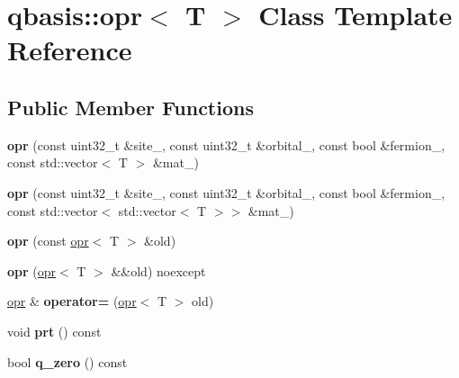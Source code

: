 \hypertarget{classqbasis_1_1opr}{}\section{qbasis\+:\+:opr$<$ T $>$ Class Template Reference}
\label{classqbasis_1_1opr}
\subsection*{Public Member Functions}
\begin{DoxyCompactItemize}
\item 
\mbox{\label{classqbasis_1_1opr_ab209565d2cbc1a241437dee946813fda}} 
{\bfseries opr} (const uint32\+\_\+t \&site\+\_\+, const uint32\+\_\+t \&orbital\+\_\+, const bool \&fermion\+\_\+, const std\+::vector$<$ T $>$ \&mat\+\_\+)
\item 
\mbox{\label{classqbasis_1_1opr_a162e69e386933f1c05e528b68505b103}} 
{\bfseries opr} (const uint32\+\_\+t \&site\+\_\+, const uint32\+\_\+t \&orbital\+\_\+, const bool \&fermion\+\_\+, const std\+::vector$<$ std\+::vector$<$ T $>$$>$ \&mat\+\_\+)
\item 
\mbox{\label{classqbasis_1_1opr_adad9b936ab5d56fe95c3fddce184a5e2}} 
{\bfseries opr} (const \hyperlink{classqbasis_1_1opr}{opr}$<$ T $>$ \&old)
\item 
\mbox{\label{classqbasis_1_1opr_a38a0c9e69989bf991066db88881cadd0}} 
{\bfseries opr} (\hyperlink{classqbasis_1_1opr}{opr}$<$ T $>$ \&\&old) noexcept
\item 
\mbox{\label{classqbasis_1_1opr_ad1babbabe40e6af3e7d23ff6ac2769fe}} 
\hyperlink{classqbasis_1_1opr}{opr} \& {\bfseries operator=} (\hyperlink{classqbasis_1_1opr}{opr}$<$ T $>$ old)
\item 
\mbox{\label{classqbasis_1_1opr_a002439432460bab5f96f4c2dfb0b5bf0}} 
void {\bfseries prt} () const
\item 
\mbox{\label{classqbasis_1_1opr_a00b2dc48e5b639a6b5a4cec5a412f112}} 
bool {\bfseries q\+\_\+zero} () const
\item 
\mbox{\label{classqbasis_1_1opr_a1fe86437b95348eb7f247d3dcf2f79ba}} 
$$
\end{DoxyCompactItemize}
